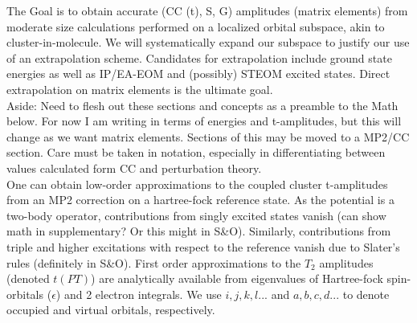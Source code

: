 \documentclass[letterpaper, 12pt]{article}
\begin{document}
The Goal is to obtain accurate (CC (t), S, G) amplitudes (matrix elements) from moderate size calculations performed on a localized orbital subspace, akin to cluster-in-molecule. We will systematically expand our subspace to justify our use of an extrapolation scheme. Candidates for extrapolation include ground state energies as well as IP/EA-EOM and (possibly) STEOM excited states. Direct extrapolation on matrix elements is the ultimate goal. \\

Aside: Need to flesh out these sections and concepts as a preamble to the Math below. For now I am writing in terms of energies and t-amplitudes, but this will change as we want matrix elements. Sections of this may be moved to a MP2/CC section. Care must be taken in notation, especially in differentiating between values calculated form CC and perturbation theory. \\

One can obtain low-order approximations to the coupled cluster t-amplitudes from an MP2 correction on a hartree-fock reference state. As the potential is a two-body operator, contributions from singly excited states vanish (can show math in supplementary? Or this might in S\&O). Similarly, contributions from triple and higher excitations with respect to the reference vanish due to Slater's rules (definitely in S\&O). First order approximations to the $T_2$ amplitudes (denoted $t(PT)$) are analytically available from eigenvalues of Hartree-fock spin-orbitals ($\epsilon$) and 2 electron integrals. We use $i,j,k,l...$ and $a,b,c,d ...$  to denote occupied and virtual orbitals, respectively. 
\end{document}
